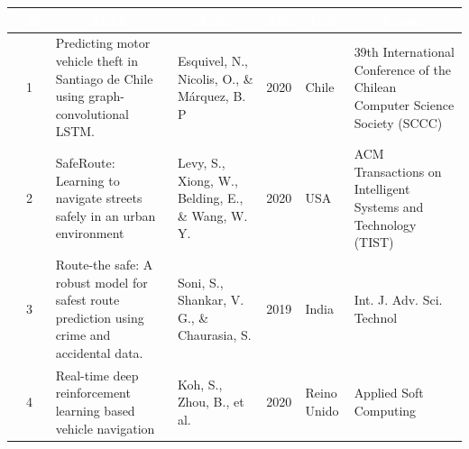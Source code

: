 \begin{table}[h]
	\newcommand{\multirot}[1]{\multirow{2}{*}[-8ex]{\rotcell{\rlap{#1}}}}
	\footnotesize
	\centering
	\begin{tabular}{|m{0.5cm}|m{0.3cm}|m{4cm}|m{2cm}|m{0.6cm}|m{1.7cm}|m{3cm}|} 
		\hline
		\rowcolor[rgb]{0,0.251,0.502} \multicolumn{1}{|c|}{\textcolor{white}{Tipo}} & \multicolumn{1}{c|}{\textcolor{white}{N°}} & \multicolumn{1}{c|}{\textcolor{white}{Título}}                                                                             & \multicolumn{1}{c|}{\textcolor{white}{Autor}}        & \multicolumn{1}{c|}{\textcolor{white}{Año}} & \multicolumn{1}{c|}{\textcolor{white}{País}} & \multicolumn{1}{c|}{\textcolor{white}{Fuente}}                                                        \\ 
		\hline
		\multirot{Problema}                                        & 1                                             &Predicting motor vehicle theft in Santiago de Chile using graph-convolutional LSTM.                                                                               & Esquivel, N., Nicolis, O., \& Márquez, B. P                                 & 2020                                      & Chile                               & 39th International Conference of the Chilean Computer Science Society (SCCC)                                                                                      \\ 
		\cline{2-7}
		& 2                                             & SafeRoute: Learning to navigate streets safely in an urban environment                                                            & Levy, S., Xiong, W., Belding, E., \& Wang, W. Y.                     & 2020                                        & USA                                  &ACM Transactions on Intelligent Systems and Technology (TIST)                                                \\ 
		\hline
		\multirow{3}{*}[-14ex]{\rotcell{\rlap{Propuesta}}}
		& 3                                             & Route-the safe: A robust model for safest route prediction using crime and accidental data.                           & Soni, S., Shankar, V. G., \& Chaurasia, S.                             & 2019                                        & India                                          & Int. J. Adv. Sci. Technol                                                                    \\ 
		\cline{2-7}
		& 4                                             & Real-time deep reinforcement learning based vehicle navigation                                                                                & Koh, S., Zhou, B., et al.                                          & 2020                                        & Reino Unido                                          & Applied Soft Computing                                                             \\ 

\end{tabular}
\end{table}
